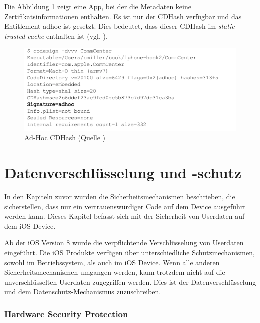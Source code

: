 Die Abbildung \ref{fig:Ad-Hoc CDHash} zeigt eine App, bei der die Metadaten keine Zertifikatsinformationen enthalten. Es ist nur der CDHash verfügbar und das Entitlement adhoc ist gesetzt. Dies bedeutet, dass dieser CDHash im \textit{\glqq static trusted cache\grqq{}} enthalten ist (vgl. \cite{Sign[1], Sign[2], Sign[3], Sign[4], Sign[5]}).

\begin{figure}[!ht]
        \centering
        \includegraphics[scale=0.9]{ADhoc_CDHash.png}
        \caption{Ad-Hoc CDHash (Quelle \cite{Hacking[1]})}
        \label{fig:Ad-Hoc CDHash}
\end{figure}
\newpage
\section{Datenverschlüsselung und -schutz}
\label{sec:EncryptionandDataProtection}

In den Kapiteln zuvor wurden die Sicherheitsmechanismen beschrieben, die sicherstellen, dass nur ein vertrauenswürdiger Code auf dem Device ausgeführt werden kann. Dieses Kapitel befasst sich mit der Sicherheit von Userdaten auf dem iOS Device. 

Ab der iOS Version 8 wurde die verpflichtende Verschlüsselung von Userdaten eingeführt. Die iOS Produkte verfügen über unterschiedliche Schutzmechanismen, sowohl im Betriebssystem, als auch im iOS Device. Wenn alle anderen Sicherheitsmechanismen umgangen werden, kann trotzdem nicht auf die unverschlüsselten Userdaten zugegriffen werden. Dies ist der Datenverschlüsselung und dem Datenschutz-Mechanismus zuzuschreiben.

\subsubsection{Hardware Security Protection}
\label{sec:HardwareSecProtection}

